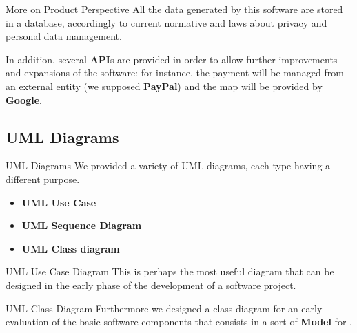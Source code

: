\documentclass{../Common/Structure/pdf_presentation}
\begin{document}
	\begin{frame}{More on Product Perspective}
		All the data generated by this software are stored in a database, accordingly to current normative and laws about privacy and personal data management.\par
		In addition, several \textbf{API}s are provided in order to allow further improvements and expansions of the software: for instance, the payment will be managed from an external entity (we supposed \textbf{PayPal}) and the map will be provided by \textbf{Google}.
	\end{frame}
	\subsection{UML Diagrams}
	\begin{frame}{UML Diagrams}
		We provided a variety of UML diagrams, each type having a different purpose.
		\begin{itemize}
			\item\textbf{UML Use Case} %
			\item\textbf{UML Sequence Diagram} %
			\item\textbf{UML Class diagram} %
		\end{itemize}
	\end{frame}
	\begin{frame}{UML Use Case Diagram}
		This is perhaps the most useful diagram that can be designed in the early phase of the development of a software project.
	\end{frame}
	\begin{frame}{UML Class Diagram}
		Furthermore we designed a class diagram for an early evaluation of the basic software components that consists in a sort of \textbf{Model} for \PowerEnJoy{}.
	\end{frame}
\end{document}
